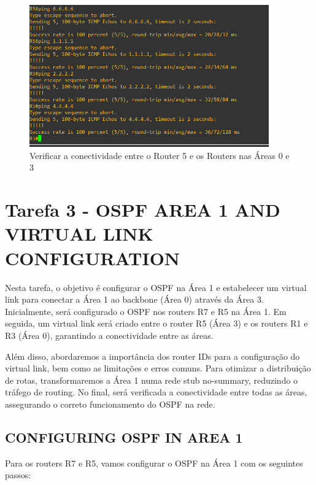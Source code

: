 \documentclass[11pt,english, openright, oneside]{book}
\begin{document}
\begin{figure}[H]
    \centering
    \includegraphics[width=0.92\textwidth]{imagens/Tarefa2/11.ping_R5.png}
    \caption{Verificar a conectividade entre o Router 5 e os Routers nas Áreas 0 e 3}
    \label{fig:config17}
\end{figure}

\pagebreak

\section{Tarefa 3 - OSPF AREA 1 AND VIRTUAL LINK CONFIGURATION}
\vspace{0.2cm}

Nesta tarefa, o objetivo é configurar o OSPF na Área 1 e estabelecer um virtual link para conectar a Área 1 ao backbone (Área 0) através da Área 3. Inicialmente, será configurado o OSPF nos routers R7 e R5 na Área 1. Em seguida, um virtual link será criado entre o router R5 (Área 3) e os routers R1 e R3 (Área 0), garantindo a conectividade entre as áreas.

Além disso, abordaremos a importância dos router IDs para a configuração do virtual link, bem como as limitações e erros comuns. Para otimizar a distribuição de rotas, transformaremos a Área 1 numa rede stub no-summary, reduzindo o tráfego de routing. No final, será verificada a conectividade entre todas as áreas, assegurando o correto funcionamento do OSPF na rede.
\vspace{0.2cm}

\subsection{CONFIGURING OSPF IN AREA 1}
\vspace{0.2cm}

Para os routers R7 e R5, vamos configurar o OSPF na Área 1 com os seguintes passos:
\vspace{0.2cm}
\end{document}

